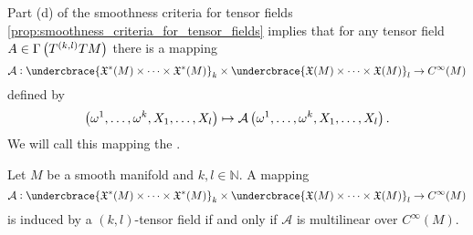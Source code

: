 Part (d) of the smoothness criteria for tensor fields \ref{prop:smoothness_criteria_for_tensor_fields} implies that for any tensor field $A \in \Gamma\del[1]{T^{(k,l)}TM}$ there is a mapping 
\begin{equation*}
	\mathcal{A} : \undercbrace{\mathfrak{X}^*(M) \times \dots \times \mathfrak{X}^*(M)}_{k} \times \undercbrace{\mathfrak{X}(M) \times \dots \times \mathfrak{X}(M)}_{l} \to C^\infty(M)
\end{equation*}
\noindent defined by 
\begin{equation*}
	\del[1]{\omega^1,\dots,\omega^k,X_1,\dots,X_l} \mapsto \mathcal{A}\del[1]{\omega^1,\dots,\omega^k,X_1,\dots,X_l}.
\end{equation*}
We will call this mapping the .

\begin{proposition}
	\label{prop:tensor_field_characterisation_lemma}
	Let $M$ be a smooth manifold and $k,l \in \mathbb{N}$. A mapping
\begin{equation*}
	\mathcal{A}: \undercbrace{\mathfrak{X}^*(M) \times \dots \times \mathfrak{X}^*(M)}_{k} \times \undercbrace{\mathfrak{X}(M) \times \dots \times \mathfrak{X}(M)}_{l} \to C^\infty(M) 
	\end{equation*}
	\noindent is induced by a $(k,l)$-tensor field if and only if $\mathcal{A}$ is multilinear over $C^\infty(M)$.
\end{proposition}

